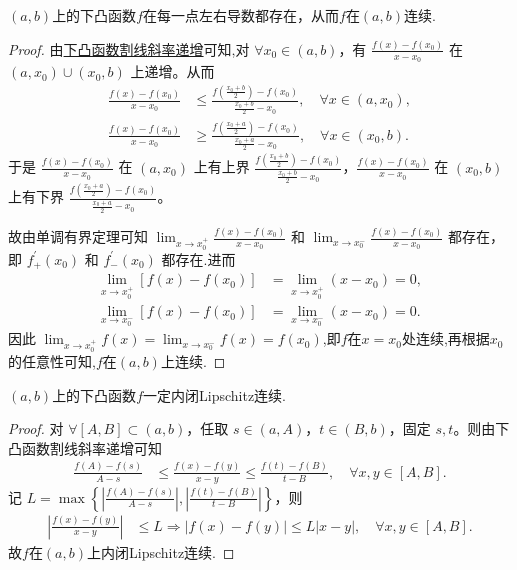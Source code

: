 \documentclass[lang=cn,newtx,10pt,scheme=chinese]{elegantbook}
\begin{document}
\begin{theorem}[开区间下凸函数左右导数处处存在]\label{theorem:开区间下凸函数左右导数处处存在}
\((a,b)\)上的下凸函数\(f\)在每一点左右导数都存在，从而\(f\)在\((a,b)\)连续.
\end{theorem}
\begin{proof}
由\hyperref[下凸函数割线斜率递增]{下凸函数割线斜率递增}可知,对 $\forall x_0\in (a,b)$，有 $\frac{f(x) - f(x_0)}{x - x_0}$ 在 $(a,x_0) \cup (x_0,b)$ 上递增。从而
\begin{align*}
\frac{f(x) - f(x_0)}{x - x_0} &\leqslant \frac{f\left(\frac{x_0 + b}{2}\right) - f(x_0)}{\frac{x_0 + b}{2} - x_0}, \quad \forall x\in (a,x_0), \\
\frac{f(x) - f(x_0)}{x - x_0} &\geqslant \frac{f\left(\frac{x_0 + a}{2}\right) - f(x_0)}{\frac{x_0 + a}{2} - x_0}, \quad \forall x\in (x_0,b).
\end{align*}
于是 $\frac{f(x) - f(x_0)}{x - x_0}$ 在 $(a,x_0)$ 上有上界 $\frac{f\left(\frac{x_0 + b}{2}\right) - f(x_0)}{\frac{x_0 + b}{2} - x_0}$，$\frac{f(x) - f(x_0)}{x - x_0}$ 在 $(x_0,b)$ 上有下界 $\frac{f\left(\frac{x_0 + a}{2}\right) - f(x_0)}{\frac{x_0 + a}{2} - x_0}$。

故由单调有界定理可知 $\lim_{x \to x_0^+} \frac{f(x) - f(x_0)}{x - x_0}$ 和 $\lim_{x \to x_0^-} \frac{f(x) - f(x_0)}{x - x_0}$ 都存在，即 $f_{+}^{\prime}(x_0)$ 和 $f_{-}^{\prime}(x_0)$ 都存在.进而
\begin{align*}
\lim_{x \to x_0^+} [f(x) - f(x_0)] &= \lim_{x \to x_0^+} (x - x_0) = 0, \\
\lim_{x \to x_0^-} [f(x) - f(x_0)] &= \lim_{x \to x_0^-} (x - x_0) = 0.
\end{align*}
因此 $\lim_{x \to x_0^+} f(x) = \lim_{x \to x_0^-} f(x) = f(x_0)$,即$f$在$x=x_0$处连续,再根据$x_0$的任意性可知,$f$在$(a,b)$上连续.
\end{proof}


\begin{theorem}[开区间上的下凸函数内闭Lipschitz连续]\label{theorem:开区间上的下凸函数一定内闭Lipschitz连续}
\((a,b)\)上的下凸函数\(f\)一定内闭Lipschitz连续.
\end{theorem}
\begin{proof}
对 $\forall [A,B] \subset (a,b)$，任取 $s\in (a,A)$，$t\in (B,b)$，固定 $s,t$。则由下凸函数割线斜率递增可知
\begin{align*}
\frac{f(A) - f(s)}{A - s} &\leqslant \frac{f(x) - f(y)}{x - y} \leqslant \frac{f(t) - f(B)}{t - B}, \quad \forall x,y\in [A,B].
\end{align*}
记 $L = \max\left\{\left|\frac{f(A) - f(s)}{A - s}\right|, \left|\frac{f(t) - f(B)}{t - B}\right|\right\}$，则
\begin{align*}
\left|\frac{f(x) - f(y)}{x - y}\right| &\leqslant L \Rightarrow \left|f(x) - f(y)\right| \leqslant L\left|x - y\right|, \quad \forall x,y\in [A,B].
\end{align*}
故\(f\)在$(a,b)$上内闭Lipschitz连续.
\end{proof}
\end{document}
